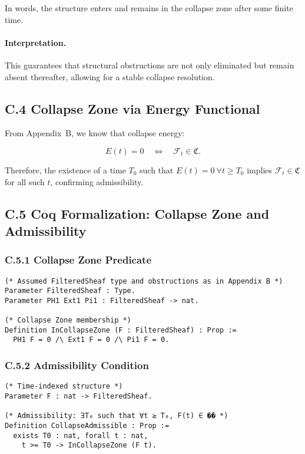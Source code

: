 \documentclass[11pt]{article}
\begin{document}
In words, the structure enters and remains in the collapse zone after some finite time.

\paragraph{Interpretation.}
This guarantees that structural obstructions are not only eliminated but remain absent thereafter, allowing for a stable collapse resolution.

\subsection*{C.4 Collapse Zone via Energy Functional}

From Appendix~B, we know that collapse energy:

\[
E(t) = 0 \quad \Leftrightarrow \quad \mathcal{F}_t \in \mathfrak{C}.
\]

Therefore, the existence of a time \( T_0 \) such that \( E(t) = 0 \ \forall t \geq T_0 \) implies \( \mathcal{F}_t \in \mathfrak{C} \) for all such \( t \), confirming admissibility.

\subsection*{C.5 Coq Formalization: Collapse Zone and Admissibility}

\subsubsection*{C.5.1 Collapse Zone Predicate}

\begin{lstlisting}[language=Coq, caption=Collapse Zone Definition, captionpos=b]
(* Assumed FilteredSheaf type and obstructions as in Appendix B *)
Parameter FilteredSheaf : Type.
Parameter PH1 Ext1 Pi1 : FilteredSheaf -> nat.

(* Collapse Zone membership *)
Definition InCollapseZone (F : FilteredSheaf) : Prop :=
  PH1 F = 0 /\ Ext1 F = 0 /\ Pi1 F = 0.
\end{lstlisting}

\subsubsection*{C.5.2 Admissibility Condition}

\begin{lstlisting}[language=Coq, caption=Collapse Admissibility Definition, captionpos=b]
(* Time-indexed structure *)
Parameter F : nat -> FilteredSheaf.

(* Admissibility: ∃T₀ such that ∀t ≥ T₀, F(t) ∈ �� *)
Definition CollapseAdmissible : Prop :=
  exists T0 : nat, forall t : nat,
    t >= T0 -> InCollapseZone (F t).
\end{lstlisting}
\end{document}
